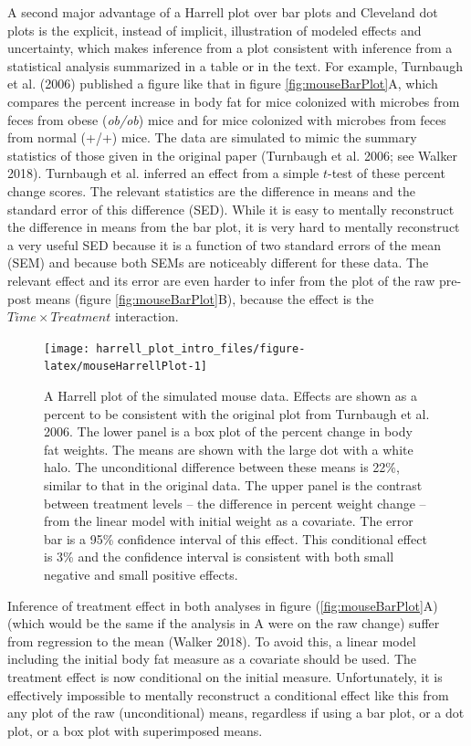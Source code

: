 \documentclass[fleqn,10pt,lineno]{wlpeerj} %
\theoremstyle{definition}
\theoremstyle{definition}
\theoremstyle{definition}
\theoremstyle{remark}
\begin{document}
A second major advantage of a Harrell plot over bar plots and Cleveland
dot plots is the explicit, instead of implicit, illustration of modeled
effects and uncertainty, which makes inference from a plot consistent
with inference from a statistical analysis summarized in a table or in
the text. For example, Turnbaugh et al. (2006) published a figure like
that in figure \ref{fig:mouseBarPlot}A, which compares the percent
increase in body fat for mice colonized with microbes from feces from
obese (\emph{ob/ob}) mice and for mice colonized with microbes from
feces from normal (+/+) mice. The data are simulated to mimic the
summary statistics of those given in the original paper (Turnbaugh et
al. 2006; see Walker 2018). Turnbaugh et al. inferred an effect from a
simple \(t\)-test of these percent change scores. The relevant
statistics are the difference in means and the standard error of this
difference (SED). While it is easy to mentally reconstruct the
difference in means from the bar plot, it is very hard to mentally
reconstruct a very useful SED because it is a function of two standard
errors of the mean (SEM) and because both SEMs are noticeably different
for these data. The relevant effect and its error are even harder to
infer from the plot of the raw pre-post means (figure
\ref{fig:mouseBarPlot}B), because the effect is the
\(Time \times Treatment\) interaction.

\begin{figure}
\texttt{[image: harrell\_plot\_intro\_files/figure-latex/mouseHarrellPlot-1]} \caption{A Harrell plot of the simulated mouse data. Effects are shown as a percent to be consistent with the original plot from Turnbaugh et al. 2006. The lower panel is a box plot of the percent change in body fat weights. The means are shown with the large dot with a white halo. The unconditional difference between these means is 22\%, similar to that in the original data. The upper panel is the contrast between treatment levels -- the difference in percent weight change -- from the linear model with initial weight as a covariate. The error bar is a 95\% confidence interval of this effect. This conditional effect is 3\% and the confidence interval is consistent with both small negative and small positive effects.}\label{fig:mouseHarrellPlot}
\end{figure}

Inference of treatment effect in both analyses in figure
(\ref{fig:mouseBarPlot}A) (which would be the same if the analysis in A
were on the raw change) suffer from regression to the mean (Walker
2018). To avoid this, a linear model including the initial body fat
measure as a covariate should be used. The treatment effect is now
conditional on the initial measure. Unfortunately, it is effectively
impossible to mentally reconstruct a conditional effect like this from
any plot of the raw (unconditional) means, regardless if using a bar
plot, or a dot plot, or a box plot with superimposed means.
\end{document}
